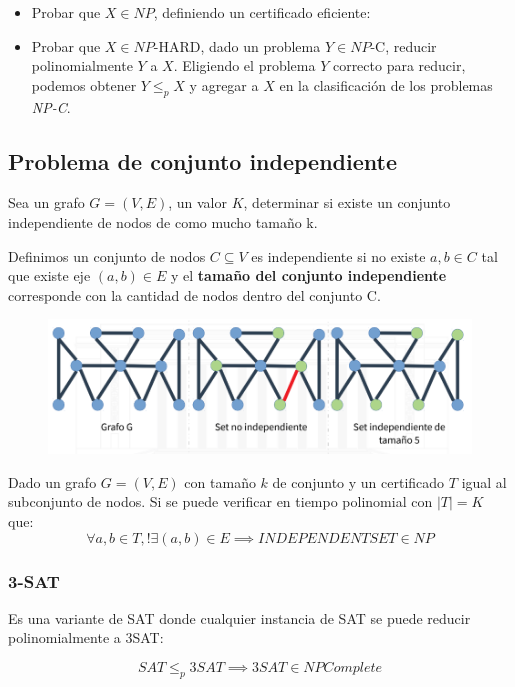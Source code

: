 \documentclass{article}
\begin{document}
\begin{itemize}
    \item Probar que \(X \in NP\), definiendo un certificado eficiente:
    \item Probar que \(X \in NP\)-HARD, dado un problema \(Y \in NP\)-C, 
    reducir polinomialmente \(Y\) a \(X\). Eligiendo el problema \(Y\) correcto para reducir, 
    podemos obtener \(Y \leq_p X\) y agregar a \(X\) en la clasificación de los problemas \textit{NP-C}.
\end{itemize}


\subsection{Problema de conjunto independiente}

Sea un grafo \(G=(V,E)\), un valor \(K\), determinar si existe un conjunto independiente de nodos 
de como mucho tamaño k.

Definimos un conjunto de nodos \(C \subseteq V\) es independiente si no existe \(a,b \in C\) tal que existe eje \((a,b) \in E\) 
y el \textbf{tamaño del conjunto independiente} corresponde con la cantidad de nodos dentro del conjunto C.

\begin{figure}[h!]
    \includegraphics[width=\linewidth]{imagenes/conjunto-independiente.png}
\end{figure}

Dado un grafo \(G=(V,E)\) con tamaño \(k\) de conjunto y un certificado \(T\) igual 
al subconjunto de nodos. Si se puede verificar en tiempo polinomial con \(|T| = K\) que:
\[
    \forall a,b \in T, !\exists (a,b) \in E \implies INDEPENDENTSET \in NP    
\]

\subsubsection{3-SAT}
Es una variante de SAT donde cualquier instancia de SAT se puede reducir polinomialmente a 3SAT:

\[
    SAT \leq_p 3SAT \implies 3SAT \in NPComplete
\]
\end{document}
